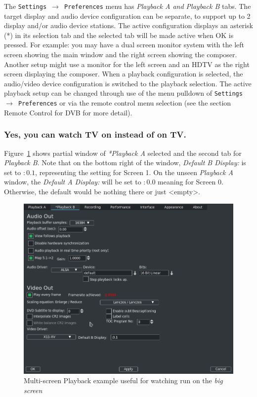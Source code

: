 The \texttt{Settings $\rightarrow$ Preferences} menu has \textit{Playback A and Playback B} tabs.  The target display and audio device configuration can be separate, to support up to 2 display and/or audio device stations.  The active configuration displays an asterisk (*) in its selection tab and the selected tab will be made active when OK is pressed.  For example: you may have a dual screen monitor system with the left screen showing the \CGG{} main window and the right screen showing the composer.  Another setup might use a monitor for the left screen and an HDTV as the right screen displaying the composer.  When a playback configuration is selected, the audio/video device configuration is switched to the playback selection.  The active playback setup can be changed through use of the menu pulldown of \texttt{Settings $\rightarrow$ Preferences} or via the remote control menu selection (see the section Remote Control for DVB for more detail). 

\subsubsection*{Yes, you can watch TV on \CGG{} instead of \CGG{} on TV.}%
\label{ssub:watch_tv_on_cinelerra}

Figure~\ref{fig:multi-screen01} shows partial window of \textit{*Playback A} selected and the second tab for \textit{Playback B}.  Note that on the bottom right of the window, \textit{Default B Display:} is set to $:0.1$, representing the setting for Screen 1.  On the unseen \textit{Playback A} window, the \textit{Default A Display:} will be set to $:0.0$ meaning for Screen 0.  Otherwise, the default would be nothing there or just <empty>.

\begin{figure}[htpb]
    \centering
    \includegraphics[width=0.9\linewidth]{images/multi-screen01.png}
    \caption{Multi-screen Playback example useful for watching \CGG{} run on the \textit{big screen}}
    \label{fig:multi-screen01}
\end{figure}

